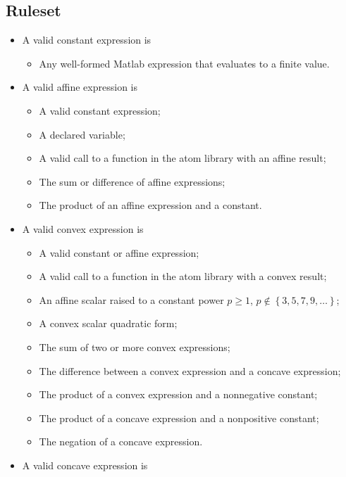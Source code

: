 \documentclass{article}
\begin{document}
\subsection{Ruleset \autocite{DCPRulesetCVX}}
\begin{itemize}
	\item A valid constant expression is
	\begin{itemize}
        \item Any well-formed Matlab expression that evaluates to a finite value.
    \end{itemize}
    \item A valid affine expression is
    \begin{itemize}
        \item A valid constant expression;
        \item A declared variable;
        \item A valid call to a function in the atom library with an affine result;
        \item The sum or difference of affine expressions;
        \item The product of an affine expression and a constant.
    \end{itemize}
    \item A valid convex expression is
    \begin{itemize}
        \item A valid constant or affine expression;
        \item A valid call to a function in the atom library with a convex result;
        \item An affine scalar raised to a constant power \(p\geq1\), \(p \notin \left\{3,5,7,9,\dots\right\}\);
        \item A convex scalar quadratic form;
        \item The sum of two or more convex expressions;
        \item The difference between a convex expression and a concave expression;
        \item The product of a convex expression and a nonnegative constant;
        \item The product of a concave expression and a nonpositive constant;
        \item The negation of a concave expression.
    \end{itemize}
    \item A valid concave expression is
    \begin{itemize}

\end{itemize}
\end{itemize}
\end{document}
